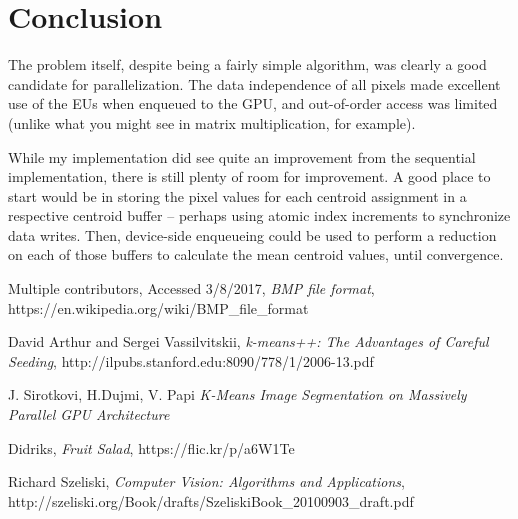 \documentclass[11pt]{article}
\begin{document}
\section{Conclusion}

The problem itself, despite being a fairly simple algorithm, was clearly a good candidate for
parallelization. The data independence of all pixels made excellent use of the EUs when enqueued
to the GPU, and out-of-order access was limited (unlike what you might see in matrix multiplication,
for example).

While my implementation did see quite an improvement from the sequential implementation, there is still
plenty of room for improvement. A good place to start would be in storing the pixel values for each
centroid assignment in a respective centroid buffer -- perhaps using atomic index increments to synchronize
data writes. Then, device-side enqueueing could be used to perform a reduction on each of those buffers
to calculate the mean centroid values, until convergence.

\begin{thebibliography}{9}

  Multiple contributors,
  Accessed 3/8/2017,
  \emph{BMP file format},
  https://en.wikipedia.org/wiki/BMP\_file\_format

  David Arthur and Sergei Vassilvitskii,
  \emph{k-means++: The Advantages of Careful Seeding},
  http://ilpubs.stanford.edu:8090/778/1/2006-13.pdf

  J. Sirotkovi, H.Dujmi, V. Papi
  \emph{K-Means Image Segmentation on Massively Parallel GPU Architecture}

  Didriks,
  \emph{Fruit Salad},
  https://flic.kr/p/a6W1Te

  Richard Szeliski,
  \emph{Computer Vision: Algorithms and Applications},
  http://szeliski.org/Book/drafts/SzeliskiBook\_20100903\_draft.pdf


\end{thebibliography}
\end{document}
